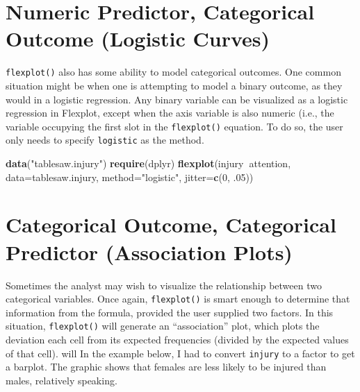 \documentclass[,]{book}
\newenvironment{Shaded}{\begin{snugshade}}{\end{snugshade}}
\newcommand{\KeywordTok}[1]{\textcolor[rgb]{0.13,0.29,0.53}{\textbf{#1}}}
\newcommand{\DataTypeTok}[1]{\textcolor[rgb]{0.13,0.29,0.53}{#1}}
\newcommand{\DecValTok}[1]{\textcolor[rgb]{0.00,0.00,0.81}{#1}}
\newcommand{\StringTok}[1]{\textcolor[rgb]{0.31,0.60,0.02}{#1}}
\newcommand{\OperatorTok}[1]{\textcolor[rgb]{0.81,0.36,0.00}{\textbf{#1}}}
\newcommand{\NormalTok}[1]{#1}
\begin{document}
\section*{Numeric Predictor, Categorical Outcome (Logistic
Curves)}\label{numeric-predictor-categorical-outcome-logistic-curves}

\texttt{flexplot()} also has some ability to model categorical outcomes.
One common situation might be when one is attempting to model a binary
outcome, as they would in a logistic regression. Any binary variable can
be visualized as a logistic regression in Flexplot, except when the axis
variable is also numeric (i.e., the variable occupying the first slot in
the \texttt{flexplot()} equation. To do so, the user only needs to
specify \texttt{logistic} as the method.

\begin{Shaded}
\begin{Highlighting}[]
\KeywordTok{data}\NormalTok{(}\StringTok{"tablesaw.injury"}\NormalTok{)}
\KeywordTok{require}\NormalTok{(dplyr)}
\KeywordTok{flexplot}\NormalTok{(injury}\OperatorTok{~}\NormalTok{attention, }\DataTypeTok{data=}\NormalTok{tablesaw.injury, }
             \DataTypeTok{method=}\StringTok{"logistic"}\NormalTok{, }\DataTypeTok{jitter=}\KeywordTok{c}\NormalTok{(}\DecValTok{0}\NormalTok{, .}\DecValTok{05}\NormalTok{))}
\end{Highlighting}
\end{Shaded}

\section*{Categorical Outcome, Categorical Predictor (Association
Plots)}\label{categorical-outcome-categorical-predictor-association-plots}

Sometimes the analyst may wish to visualize the relationship between two
categorical variables. Once again, \texttt{flexplot()} is smart enough
to determine that information from the formula, provided the user
supplied two factors. In this situation, \texttt{flexplot()} will
generate an ``association'' plot, which plots the deviation each cell
from its expected frequencies (divided by the expected values of that
cell). will In the example below, I had to convert \texttt{injury} to a
factor to get a barplot. The graphic shows that females are less likely
to be injured than males, relatively speaking.
\end{document}
